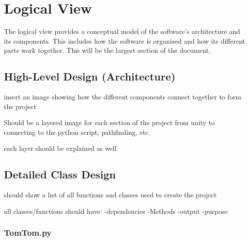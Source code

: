 \section{Logical View}

The logical view provides a conceptual model of the software's architecture and its components. 
This includes how the software is organized and how its different parts work together.
This will be the largest section of the document.

\subsection{High-Level Design (Architecture)}

insert an image showing how the different components connect together to form the project

Should be a layered image for each section of the project from unity to connecting to the python script, pathfinding, etc.

each layer should be explained as well

\subsection{Detailed Class Design}

should show a list of all functions and classes used to create the project

all classes/functions should have:
-dependencies
-Methods
-output
-purpose

\subsubsection{TomTom.py}

